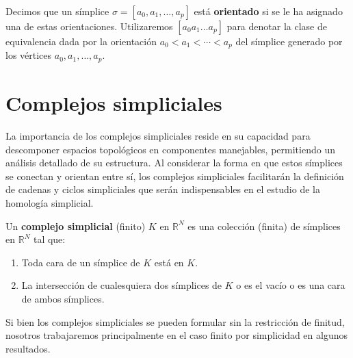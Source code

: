 \begin{definicion}
	Decimos que un símplice $\sigma = [a_{0}, a_{1}, \ldots, a_{p}]$ está \textbf{orientado}
	si se le ha asignado una de estas orientaciones. Utilizaremos $[a_{0}a_{1}\ldots
	a_{p}]$ para denotar la clase de equivalencia dada por la orientación $a_{0}< a
	_{1}< \cdots < a_{p}$ del símplice generado por los vértices $a_{0},a_{1},\ldots
	, a_{p}$.
\end{definicion}

\section{Complejos simpliciales}

La importancia de los complejos simpliciales reside en su capacidad para
descomponer espacios topológicos en componentes manejables, permitiendo un análisis
detallado de su estructura. Al considerar la forma en que estos símplices se
conectan y orientan entre sí, los complejos simpliciales facilitarán la definición
de cadenas y ciclos simpliciales que serán indispensables en el estudio de la homología
simplicial.

\begin{definicion}
	Un \textbf{complejo simplicial} (finito) $K$ en $\mathbb{R}^{N}$ es una
	colección (finita) de símplices en $\mathbb{R}^{N}$ tal que:
	\begin{enumerate}
		\item Toda cara de un símplice de $K$ está en $K$.
		
		\item La intersección de cualesquiera dos símplices de $K$ o es el vacío o es
		una cara de ambos símplices.
	\end{enumerate}
\end{definicion}
\begin{nota}
	Si bien los complejos simpliciales se pueden formular sin la restricción de finitud,
	nosotros trabajaremos principalmente en el caso finito por simplicidad en
	algunos resultados.
\end{nota}

